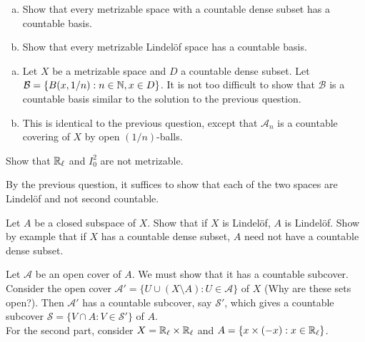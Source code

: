 	\begin{exercise}
		\phantom{ah}
		\begin{enumerate}[(a)]
			\item Show that every metrizable space with a countable dense subset has a countable basis.
			\item Show that every metrizable Lindel\"{o}f space has a countable basis.
		\end{enumerate}
	\end{exercise}
	\begin{solution*}
		\begin{enumerate}[(a)]
			\item Let $X$ be a metrizable space and $D$ a countable dense subset. Let $\mathcal{B} = \{B(x,1/n) : n\in\mathbb{N}, x\in D\}$. It is not too difficult to show that $\mathcal{B}$ is a countable basis similar to the solution to the previous question.
			\item This is identical to the previous question, except that $\mathcal{A}_n$ is a countable covering of $X$ by open $(1/n)$-balls.
		\end{enumerate}
	\end{solution*}

	\begin{exercise}
		Show that $\mathbb{R}_\ell$ and $I_0^2$ are not metrizable.
	\end{exercise}
	\begin{solution*}
		By the previous question, it suffices to show that each of the two spaces are Lindel\"{o}f and not second countable. 
	\end{solution*}

	\setcounter{exercise}{8}
	\begin{exercise}
		Let $A$ be a closed subspace of $X$. Show that if $X$ is Lindel\"{o}f, $A$ is Lindel\"{o}f. Show by example that if $X$ has a countable dense subset, $A$ need not have a countable dense subset.
	\end{exercise}
	\begin{solution*}
		Let $\mathcal{A}$ be an open cover of $A$. We must show that it has a countable subcover. Consider the open cover $\mathcal{A}' = \{U \cup (X\setminus A) : U\in\mathcal{A}\}$ of $X$ (Why are these sets open?). Then $\mathcal{A}'$ has a countable subcover, say $\mathcal{S}'$, which gives a countable subcover $\mathcal{S} = \{V \cap A : V\in\mathcal{S}'\}$ of $A$.\\
		For the second part, consider $X = \mathbb{R}_\ell \times \mathbb{R}_\ell$ and $A = \{ x \times (-x) : x \in \mathbb{R}_\ell\}$. 
	\end{solution*}

